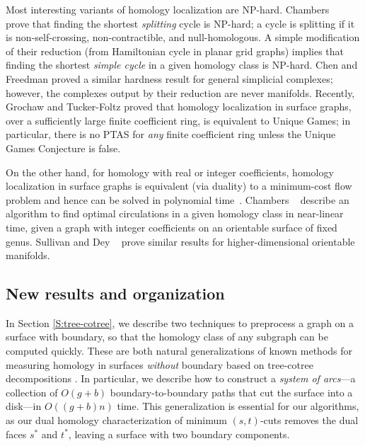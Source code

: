 \documentclass[letterpaper,review]{siamart190516}
\def\anote#1{\color{purple}Amir: #1 \color{black}}
\def\rnote#1{\color{red}Review: #1 \color{black}}
\begin{document}
Most interesting variants of homology localization are NP-hard.  Chambers \etal~\cite{ccelw-scsih-08} prove that finding the shortest \emph{splitting} cycle is {NP}-hard; a cycle is splitting if it is non-self-crossing, non-contractible, and null-homologous.  A simple modification of their reduction (from Hamiltonian cycle in planar grid graphs) implies that finding the shortest \emph{simple cycle} in a given homology class is {NP}-hard.  Chen and Freedman \cite{cf-qhc-08, cf-qhc2-07} proved a similar hardness result for general simplicial complexes; however, the complexes output by their reduction are never manifolds.  Recently, Grochaw and Tucker-Foltz \cite{gt-ctugc-18} proved that homology localization in surface graphs, over a sufficiently large finite coefficient ring, is equivalent to Unique Games; in particular, there is no PTAS for \emph{any} finite coefficient ring unless the Unique Games Conjecture is false.

On the other hand, for homology with real or integer coefficients, homology localization in surface graphs is equivalent (via duality) to a minimum-cost flow problem and hence can be solved in polynomial time~\cite{cen-hfcc-12, s-cath-90}.  Chambers \etal~\cite{cen-hfcc-12} describe an algorithm to find optimal circulations in a given homology class in near-linear time, given a graph with integer coefficients on an orientable surface of fixed genus.  Sullivan \cite{s-cath-90} and Dey \etal\ \cite{dhk-ohctu-11} prove similar results for higher-dimensional orientable manifolds.

\subsection{New results and organization}

In Section \ref{S:tree-cotree}, we describe two techniques to preprocess a graph on a surface with boundary, so that the homology class of any subgraph can be computed quickly.  These are both natural generalizations of known methods for measuring homology in surfaces \emph{without} boundary based on tree-cotree decompositions \cite{ew-gohhg-05, ccelw-scsih-08, e-dgteg-03}.  In particular, we describe how to construct a \emph{system of arcs}---a collection of $O(g+b)$ boundary-to-boundary paths that cut the surface into a disk---in $O((g+b)n)$ time.  This generalization is essential for our algorithms, as our dual homology characterization of minimum $(s,t)$-cuts removes the dual faces $s^*$ and $t^*$, leaving a surface with two boundary components.
\end{document}
